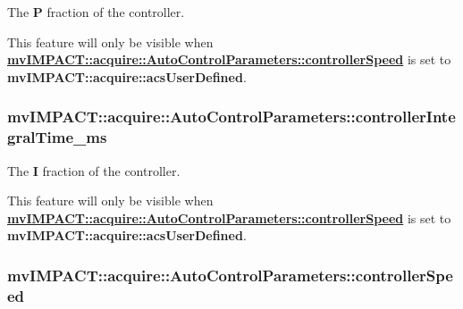 The {\bfseries P} fraction of the controller. 

This feature will only be visible when {\bfseries \hyperlink{classmv_i_m_p_a_c_t_1_1acquire_1_1_auto_control_parameters_a61db1186975bedfc4576a68fe7213521}{mv\+I\+M\+P\+A\+C\+T\+::acquire\+::\+Auto\+Control\+Parameters\+::controller\+Speed}} is set to {\bfseries mv\+I\+M\+P\+A\+C\+T\+::acquire\+::acs\+User\+Defined}. \hypertarget{classmv_i_m_p_a_c_t_1_1acquire_1_1_auto_control_parameters_a1c2f5bc53c0664de702b0c9e6a81d2f0}{
\subsubsection[{controller\+Integral\+Time\+\_\+ms}]{ mv\+I\+M\+P\+A\+C\+T\+::acquire\+::\+Auto\+Control\+Parameters\+::controller\+Integral\+Time\+\_\+ms}}\label{classmv_i_m_p_a_c_t_1_1acquire_1_1_auto_control_parameters_a1c2f5bc53c0664de702b0c9e6a81d2f0}


The {\bfseries I} fraction of the controller. 

This feature will only be visible when {\bfseries \hyperlink{classmv_i_m_p_a_c_t_1_1acquire_1_1_auto_control_parameters_a61db1186975bedfc4576a68fe7213521}{mv\+I\+M\+P\+A\+C\+T\+::acquire\+::\+Auto\+Control\+Parameters\+::controller\+Speed}} is set to {\bfseries mv\+I\+M\+P\+A\+C\+T\+::acquire\+::acs\+User\+Defined}. \hypertarget{classmv_i_m_p_a_c_t_1_1acquire_1_1_auto_control_parameters_a61db1186975bedfc4576a68fe7213521}{
\subsubsection[{controller\+Speed}]{ mv\+I\+M\+P\+A\+C\+T\+::acquire\+::\+Auto\+Control\+Parameters\+::controller\+Speed}}\label{classmv_i_m_p_a_c_t_1_1acquire_1_1_auto_control_parameters_a61db1186975bedfc4576a68fe7213521}


